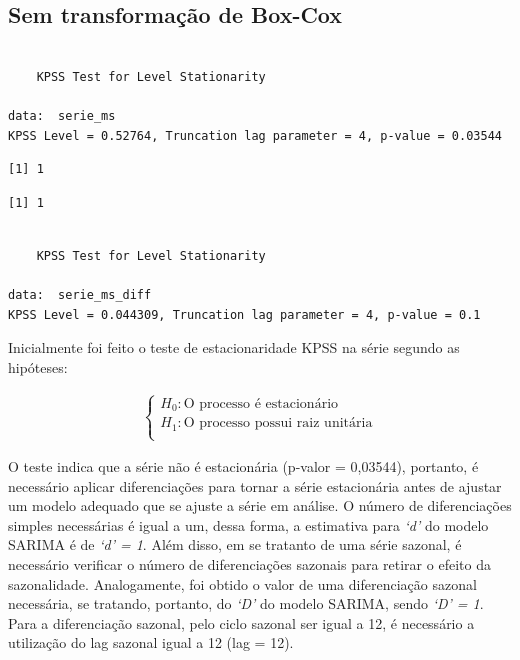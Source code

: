 \documentclass[
  letterpaper,
  DIV=11,
  numbers=noendperiod]{scrartcl}
\begin{document}
\hypertarget{sem-transformauxe7uxe3o-de-box-cox}{%
\subsection{Sem transformação de
Box-Cox}\label{sem-transformauxe7uxe3o-de-box-cox}}

\begin{verbatim}

    KPSS Test for Level Stationarity

data:  serie_ms
KPSS Level = 0.52764, Truncation lag parameter = 4, p-value = 0.03544
\end{verbatim}

\begin{verbatim}
[1] 1
\end{verbatim}

\begin{verbatim}
[1] 1
\end{verbatim}

\begin{verbatim}

    KPSS Test for Level Stationarity

data:  serie_ms_diff
KPSS Level = 0.044309, Truncation lag parameter = 4, p-value = 0.1
\end{verbatim}

Inicialmente foi feito o teste de estacionaridade KPSS na série segundo
as hipóteses:

\begin{align}
  \begin{cases}
    H_0:\text{O processo é estacionário}\\
    H_1: \text{O processo possui raiz unitária}\\
  \end{cases}
\end{align}

O teste indica que a série não é estacionária (p-valor = 0,03544),
portanto, é necessário aplicar diferenciações para tornar a série
estacionária antes de ajustar um modelo adequado que se ajuste a série
em análise. O número de diferenciações simples necessárias é igual a um,
dessa forma, a estimativa para \emph{`d'} do modelo SARIMA é de
\emph{`d' = 1}. Além disso, em se tratanto de uma série sazonal, é
necessário verificar o número de diferenciações sazonais para retirar o
efeito da sazonalidade. Analogamente, foi obtido o valor de uma
diferenciação sazonal necessária, se tratando, portanto, do \emph{`D'}
do modelo SARIMA, sendo \emph{`D' = 1}. Para a diferenciação sazonal,
pelo ciclo sazonal ser igual a 12, é necessário a utilização do lag
sazonal igual a 12 (lag = 12).
\end{document}
